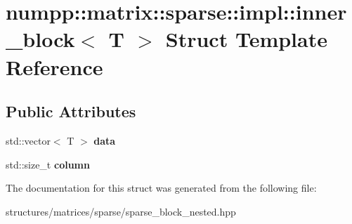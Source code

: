 \hypertarget{structnumpp_1_1matrix_1_1sparse_1_1impl_1_1inner__block}{}\section{numpp\+:\+:matrix\+:\+:sparse\+:\+:impl\+:\+:inner\+\_\+block$<$ T $>$ Struct Template Reference}
\label{structnumpp_1_1matrix_1_1sparse_1_1impl_1_1inner__block}
\subsection*{Public Attributes}
\begin{DoxyCompactItemize}
\item 
\mbox{\label{structnumpp_1_1matrix_1_1sparse_1_1impl_1_1inner__block_ac8efb78d829b3cacbd4f1be74bbc177c}} 
std\+::vector$<$ T $>$ {\bfseries data}
\item 
\mbox{\label{structnumpp_1_1matrix_1_1sparse_1_1impl_1_1inner__block_a639a53de1560842abfb420a8452bd8aa}} 
std\+::size\+\_\+t {\bfseries column}
\end{DoxyCompactItemize}


The documentation for this struct was generated from the following file\+:\begin{DoxyCompactItemize}
\item 
structures/matrices/sparse/sparse\+\_\+block\+\_\+nested.\+hpp\end{DoxyCompactItemize}
